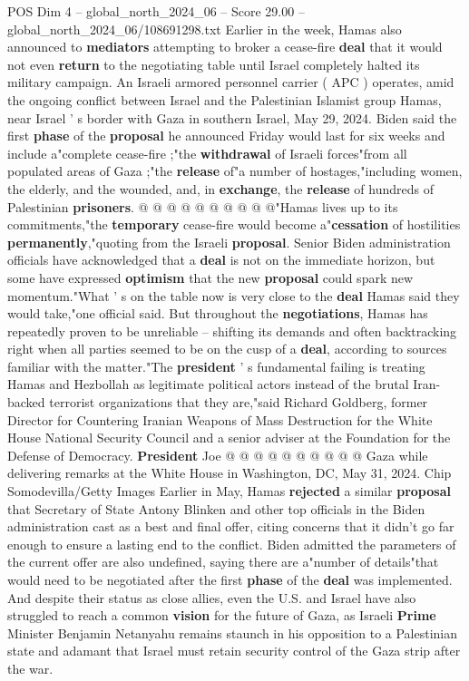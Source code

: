 \begin{textsample}{POS Dim 4 – global\_north\_2024\_06 – Score 29.00 – global\_north\_2024\_06/108691298.txt}
Earlier in the week, Hamas also announced to \textbf{mediators} attempting to broker a cease-fire \textbf{deal} that it would not even \textbf{return} to the negotiating table until Israel completely halted its military campaign.
An Israeli armored personnel carrier ( APC ) operates, amid the ongoing conflict between Israel and the Palestinian Islamist group Hamas, near Israel ' s border with Gaza in southern Israel, May 29, 2024.
Biden said the first \textbf{phase} of the \textbf{proposal} he announced Friday would last for six weeks and include a"complete cease-fire ;"the \textbf{withdrawal} of Israeli forces"from all populated areas of Gaza ;"the \textbf{release} of"a number of hostages,"including women, the elderly, and the wounded, and, in \textbf{exchange}, the \textbf{release} of hundreds of Palestinian \textbf{prisoners}. @ @ @ @ @ @ @ @ @ @"Hamas lives up to its commitments,"the \textbf{temporary} cease-fire would become a"\textbf{cessation} of hostilities \textbf{permanently},"quoting from the Israeli \textbf{proposal}.
Senior Biden administration officials have acknowledged that a \textbf{deal} is not on the immediate horizon, but some have expressed \textbf{optimism} that the new \textbf{proposal} could spark new momentum."What ' s on the table now is very close to the \textbf{deal} Hamas said they would take,"one official said.
But throughout the \textbf{negotiations}, Hamas has repeatedly proven to be unreliable -- shifting its demands and often backtracking right when all parties seemed to be on the cusp of a \textbf{deal}, according to sources familiar with the matter."The \textbf{president} ' s fundamental failing is treating Hamas and Hezbollah as legitimate political actors instead of the brutal Iran-backed terrorist organizations that they are,"said Richard Goldberg, former Director for Countering Iranian Weapons of Mass Destruction for the White House National Security Council and a senior adviser at the Foundation for the Defense of Democracy. \textbf{President} Joe @ @ @ @ @ @ @ @ @ @ Gaza while delivering remarks at the White House in Washington, DC, May 31, 2024.
Chip Somodevilla/Getty Images Earlier in May, Hamas \textbf{rejected} a similar \textbf{proposal} that Secretary of State Antony Blinken and other top officials in the Biden administration cast as a best and final offer, citing concerns that it didn't go far enough to ensure a lasting end to the conflict.
Biden admitted the parameters of the current offer are also undefined, saying there are a"number of details"that would need to be negotiated after the first \textbf{phase} of the \textbf{deal} was implemented.
And despite their status as close allies, even the U.S. and Israel have also struggled to reach a common \textbf{vision} for the future of Gaza, as Israeli \textbf{Prime} Minister Benjamin Netanyahu remains staunch in his opposition to a Palestinian state and adamant that Israel must retain security control of the Gaza strip after the war.


\end{textsample}
